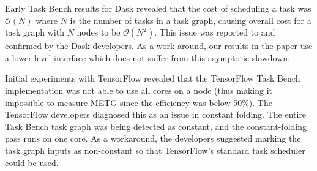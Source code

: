 Early Task Bench results for Dask revealed that the cost of scheduling
a task was $\mathcal{O}(N)$ where $N$ is the number of tasks in a task
graph, causing overall cost for a task graph with $N$ nodes to be
$\mathcal{O}(N^2)$. This issue was reported to and confirmed by the
Dask developers. As a work around, our results in the paper use a
lower-level interface which does not suffer from this asymptotic
slowdown.

Initial experiments with TensorFlow revealed that the TensorFlow Task
Bench implementation was not able to use all cores on a node (thus
making it impossible to measure METG since the efficiency was below
50\%). The TensorFlow developers diagnosed this as an issue in
constant folding. The entire Task Bench task graph was being detected
as constant, and the constant-folding pass runs on one core. As a
workaround, the developers suggested marking the task graph inputs as
non-constant so that TensorFlow's standard task scheduler could be
used.

